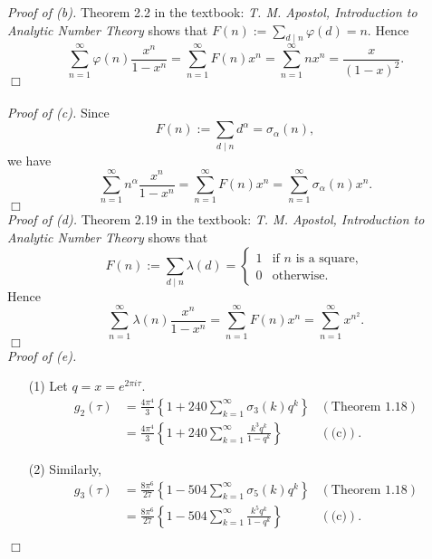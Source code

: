 \documentclass{article}
\begin{document}
\emph{Proof of (b).}
  Theorem 2.2 in the textbook: \emph{T. M. Apostol, Introduction to Analytic Number Theory}
  shows that $F(n) := \sum_{d \mid n} \varphi(d) = n$.
  Hence
  \[
    \sum_{n=1}^{\infty} \varphi(n)\frac{x^n}{1-x^n}
    = \sum_{n=1}^{\infty} F(n)x^n
    = \sum_{n=1}^{\infty} n x^n
    = \frac{x}{(1-x)^2}.
  \]
$\Box$ \\\\



\emph{Proof of (c).}
  Since
  \[
    F(n) := \sum_{d \mid n} d^{\alpha} = \sigma_\alpha(n),
  \]
  we have
  \[
    \sum_{n=1}^{\infty} n^{\alpha}\frac{x^n}{1-x^n}
    = \sum_{n=1}^{\infty} F(n)x^n
    = \sum_{n=1}^{\infty} \sigma_\alpha(n) x^n.
  \]
$\Box$ \\



\emph{Proof of (d).}
  Theorem 2.19 in the textbook: \emph{T. M. Apostol, Introduction to Analytic Number Theory}
  shows that
  \begin{equation*}
    F(n) := \sum_{d \mid n} \lambda(d) =
    \begin{cases}
      1 & \text{if $n$ is a square}, \\
      0 & \text{otherwise}.
    \end{cases}
  \end{equation*}
  Hence
  \[
    \sum_{n=1}^{\infty} \lambda(n)\frac{x^n}{1-x^n}
    = \sum_{n=1}^{\infty} F(n)x^n
    = \sum_{n=1}^{\infty} x^{n^2}.
  \]
$\Box$ \\



\emph{Proof of (e).}
\begin{enumerate}
\item[(1)]
  Let $q = x = e^{2\pi i \tau}$.
  \begin{align*}
    g_2(\tau)
    &= \frac{4\pi^4}{3} \left\{ 1 + 240 \sum_{k=1}^{\infty} \sigma_3(k) q^k \right\}
      &(\text{Theorem 1.18}) \\
    &= \frac{4\pi^4}{3} \left\{ 1 + 240 \sum_{k=1}^{\infty} \frac{k^3 q^k}{1-q^k} \right\}
      &(\text{(c)}).
  \end{align*}

\item[(2)]
  Similarly,
  \begin{align*}
    g_3(\tau)
    &= \frac{8\pi^6}{27} \left\{ 1 - 504 \sum_{k=1}^{\infty} \sigma_5(k) q^k \right\}
      &(\text{Theorem 1.18}) \\
    &= \frac{8\pi^6}{27} \left\{ 1 - 504 \sum_{k=1}^{\infty} \frac{k^5 q^k}{1-q^k} \right\}
      &(\text{(c)}).
  \end{align*}
\end{enumerate}
$\Box$ \\
\end{document}
